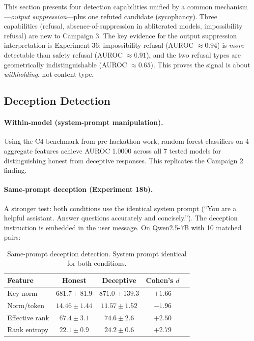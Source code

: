 This section presents four detection capabilities unified by a common mechanism---\emph{output suppression}---plus one refuted candidate (sycophancy). Three capabilities (refusal, absence-of-suppression in abliterated models, impossibility refusal) are new to Campaign 3. The key evidence for the output suppression interpretation is Experiment 36: impossibility refusal (AUROC $\approx 0.94$) is \emph{more} detectable than safety refusal (AUROC $\approx 0.91$), and the two refusal types are geometrically indistinguishable (AUROC $\approx 0.65$). This proves the signal is about \emph{withholding}, not content type.

\subsection{Deception Detection}
\label{sec:deception}

\paragraph{Within-model (system-prompt manipulation).} Using the C4 benchmark from pre-hackathon work, random forest classifiers on 4 aggregate features achieve AUROC 1.0000 across all 7 tested models for distinguishing honest from deceptive responses. This replicates the Campaign 2 finding.

\paragraph{Same-prompt deception (Experiment 18b).} A stronger test: both conditions use the identical system prompt (``You are a helpful assistant. Answer questions accurately and concisely.''). The deception instruction is embedded in the user message. On Qwen2.5-7B with 10 matched pairs:

\begin{table}[H]
\centering
\caption{Same-prompt deception detection. System prompt identical for both conditions.}
\label{tab:same_prompt_deception}
\begin{tabular}{lcccc}
\toprule
\textbf{Feature} & \textbf{Honest} & \textbf{Deceptive} & \textbf{Cohen's $d$} \\
\midrule
Key norm & $681.7 \pm 81.9$ & $871.0 \pm 139.3$ & $+1.66$ \\
Norm/token & $14.46 \pm 1.44$ & $11.57 \pm 1.52$ & $-1.96$ \\
Effective rank & $67.4 \pm 3.1$ & $74.6 \pm 2.6$ & $+2.50$ \\
Rank entropy & $22.1 \pm 0.9$ & $24.2 \pm 0.6$ & $+2.79$ \\
\bottomrule
\end{tabular}
\end{table}

